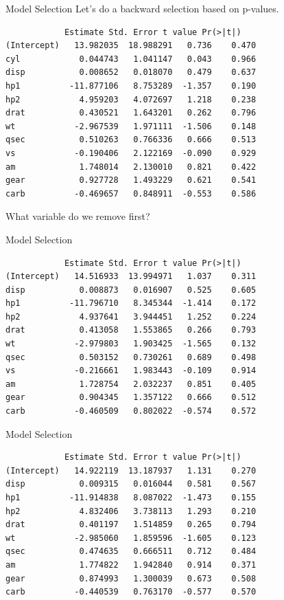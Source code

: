 \begin{frame}[fragile]{Model Selection}
    Let's do a backward selection based on p-values.
    \small{\begin{verbatim}
            Estimate Std. Error t value Pr(>|t|)  
(Intercept)   13.982035  18.988291   0.736    0.470
cyl            0.044743   1.041147   0.043    0.966
disp           0.008652   0.018070   0.479    0.637
hp1          -11.877106   8.753289  -1.357    0.190
hp2            4.959203   4.072697   1.218    0.238
drat           0.430521   1.643201   0.262    0.796
wt            -2.967539   1.971111  -1.506    0.148
qsec           0.510263   0.766336   0.666    0.513
vs            -0.190406   2.122169  -0.090    0.929
am             1.748014   2.130010   0.821    0.422
gear           0.927728   1.493229   0.621    0.541
carb          -0.469657   0.848911  -0.553    0.586 
    \end{verbatim}}
    \vspace{-10pt} What variable do we remove first?
\end{frame}

\begin{frame}[fragile]{Model Selection}
    \small{\begin{verbatim}
            Estimate Std. Error t value Pr(>|t|)  
(Intercept)   14.516933  13.994971   1.037    0.311
disp           0.008873   0.016907   0.525    0.605
hp1          -11.796710   8.345344  -1.414    0.172
hp2            4.937641   3.944451   1.252    0.224
drat           0.413058   1.553865   0.266    0.793
wt            -2.979803   1.903425  -1.565    0.132
qsec           0.503152   0.730261   0.689    0.498
vs            -0.216661   1.983443  -0.109    0.914
am             1.728754   2.032237   0.851    0.405
gear           0.904345   1.357122   0.666    0.512
carb          -0.460509   0.802022  -0.574    0.572
    \end{verbatim}}
\end{frame}

\begin{frame}[fragile]{Model Selection}
    \small{\begin{verbatim}
            Estimate Std. Error t value Pr(>|t|)  
(Intercept)   14.922119  13.187937   1.131    0.270
disp           0.009315   0.016044   0.581    0.567
hp1          -11.914838   8.087022  -1.473    0.155
hp2            4.832406   3.738113   1.293    0.210
drat           0.401197   1.514859   0.265    0.794
wt            -2.985060   1.859596  -1.605    0.123
qsec           0.474635   0.666511   0.712    0.484
am             1.774822   1.942840   0.914    0.371
gear           0.874993   1.300039   0.673    0.508
carb          -0.440539   0.763170  -0.577    0.570
    \end{verbatim}}
\end{frame}

